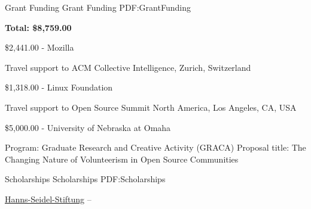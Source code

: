 \documentclass[letterpaper,MMMyyyy,nonstopmode]{simpleresumecv}
\begin{document}
\begin{Body}





\Section
{Grant Funding}
{Grant Funding}
{PDF:GrantFunding}


\Entry
\textbf{Total: \$8,759.00}

\Gap
\BulletItem
\$2,441.00 - Mozilla
\hfill {}

\begin{Detail}
\SubBulletItem
Travel support to ACM Collective Intelligence, Zurich, Switzerland
\end{Detail}

\Gap
\BulletItem
\$1,318.00 - Linux Foundation
\hfill {}

\begin{Detail}
\SubBulletItem
Travel support to Open Source Summit North America, Los Angeles, CA, USA
\end{Detail}

\Gap
\BulletItem
\$5,000.00 - University of Nebraska at Omaha
\hfill {}

\begin{Detail}
\SubBulletItem
Program: Graduate Research and Creative Activity (GRACA)
\SubBulletItem
Proposal title: The Changing Nature of Volunteerism in Open Source Communities
\end{Detail}



\Section
{Scholarships}
{Scholarships}
{PDF:Scholarships}

\BulletItem
\href{https://www.hss.de/stipendium/auswahlverfahren/internationale-studien-uni-und-medizin-uni/}
{Hanns-Seidel-Stiftung}
\hfill
{} --


\end{Body}
\end{document}
